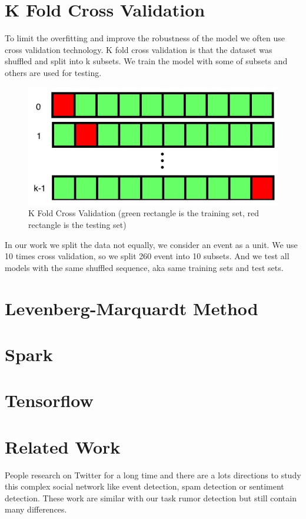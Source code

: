\newpage
\section{K Fold Cross Validation } 
To limit the overfitting and improve the robustness of the model we often use cross validation technology. K fold cross validation is that the dataset was shuffled and split into k subsets. We train the model with some of subsets and others are used for testing.
\begin{figure}[!h]
\centering
\includegraphics[width=0.55\columnwidth]{images/CrossV.png}
\caption{K Fold Cross Validation (green rectangle is the training set, red rectangle is the testing set)  }
\label{fig:GRU}
\end{figure}

In our work we split the data not equally, we consider an event as a unit.  We use 10 times cross validation, so we split 260 event into 10 subsets. And we test all models with the same shuffled sequence, aka same training sets and test sets.

\section{Levenberg-Marquardt Method} %
\label{sec:LM}

\section{Spark } %
\section{Tensorflow } %

\section{Related Work } %
People research on Twitter for a long time and there are a lots directions  to study this complex social network like event detection\cite{kimmey2015twitter}, spam detection \cite{ahmed2012mcl} \cite{wang2010don} or sentiment detection\cite{barbosa2010robust}. These work are similar with our task rumor detection but still contain many differences.

